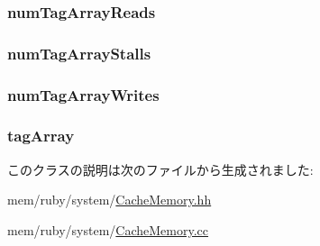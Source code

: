 \label{classCacheMemory_a97557f8d2f957731bdea9fd4537a140e}
\hypertarget{classCacheMemory_a3e723404e0119a13e13ca25460179249}{
\subsubsection[{numTagArrayReads}]{ {\bf numTagArrayReads}}}
\label{classCacheMemory_a3e723404e0119a13e13ca25460179249}
\hypertarget{classCacheMemory_aa8cfd5b3d3480062677e2229d8573483}{
\subsubsection[{numTagArrayStalls}]{ {\bf numTagArrayStalls}}}
\label{classCacheMemory_aa8cfd5b3d3480062677e2229d8573483}
\hypertarget{classCacheMemory_a3e43debd337a55436570324681b20000}{
\subsubsection[{numTagArrayWrites}]{ {\bf numTagArrayWrites}}}
\label{classCacheMemory_a3e43debd337a55436570324681b20000}
\hypertarget{classCacheMemory_a68d742104ef77f83fee4d7832cc873fe}{
\subsubsection[{tagArray}]{ {\bf tagArray}}}
\label{classCacheMemory_a68d742104ef77f83fee4d7832cc873fe}


このクラスの説明は次のファイルから生成されました:\begin{DoxyCompactItemize}
\item 
mem/ruby/system/\hyperlink{CacheMemory_8hh}{CacheMemory.hh}\item 
mem/ruby/system/\hyperlink{CacheMemory_8cc}{CacheMemory.cc}\end{DoxyCompactItemize}
